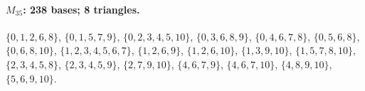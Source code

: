 \paragraph{$M_{35}$: 238 bases; 8 triangles.}
\(\{0,1,2,6,8\}\), \(\{0,1,5,7,9\}\), \(\{0,2,3,4,5,10\}\), \(\{0,3,6,8,9\}\), \(\{0,4,6,7,8\}\), \(\{0,5,6,8\}\), \(\{0,6,8,10\}\), \(\{1,2,3,4,5,6,7\}\), \(\{1,2,6,9\}\), \(\{1,2,6,10\}\), \(\{1,3,9,10\}\), \(\{1,5,7,8,10\}\), \(\{2,3,4,5,8\}\), \(\{2,3,4,5,9\}\), \(\{2,7,9,10\}\), \(\{4,6,7,9\}\), \(\{4,6,7,10\}\), \(\{4,8,9,10\}\), \(\{5,6,9,10\}\).
